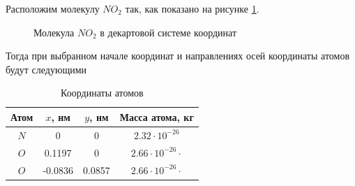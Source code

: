 Расположим молекулу $NO_2$ так, как показано на рисунке \ref{fig:geogebra-export}. 
\begin{figure}
	\centering
	\caption{Молекула $NO_2$ в декартовой системе координат}
	\label{fig:geogebra-export}
\end{figure}

Тогда при выбранном начале координат и направлениях осей координаты атомов будут следующими
\begin{table}[h!]
	\centering
	\caption{Координаты атомов}
	\label{tab3}
	\setlength{\extrarowheight}{1mm}
	\begin{tabular}{|c|c|c|c|}
		\hline 
		Атом & $x$, нм & $y$, нм & Масса атома, кг \\ 
		\hline 
		$N$ & 0 & 0 & $2.32\cdot10^{-26}$ \\ 
		\hline 
		$O$ & 0.1197 & 0 & $2.66\cdot10^{-26}\cdot$ \\ 
		\hline 
		$O$ & -0.0836 & 0.0857 & $2.66\cdot10^{-26}\cdot$ \\ 
		\hline 
	\end{tabular} 
\end{table}


